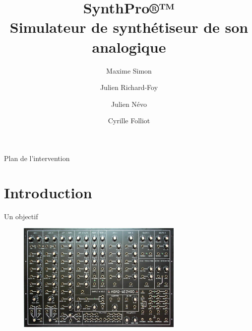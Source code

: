 \documentclass[frenchb]{beamer}
\title[SynthPro®™]{SynthPro®™\\Simulateur de synthétiseur de son analogique}
\author[BackSynth Boys]{Maxime Simon\and Julien Richard-Foy\and Julien Névo \and Cyrille Folliot}
\institute[ISTIC]{Université de Rennes 1}
\begin{document}
\begin{frame}
    \titlepage
\end{frame}
	
	
\begin{frame}{Plan de l'intervention}
    \tableofcontents
\end{frame}


\section{Introduction}


\begin{frame}{Un objectif}
    \begin{figure}
        \includegraphics[width=8cm ]{../img/png/synth.jpg}
    \end{figure}
\end{frame}
\end{document}
